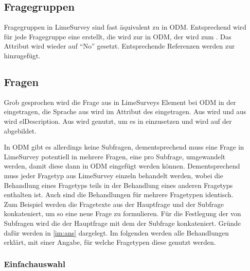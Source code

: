 \subsection{Fragegruppen}
\label{m:qg}
Fragegruppen in LimeSurvey sind fast äquivalent zu  in ODM.
Entsprechend wird für jede Fragegruppe eine  erstellt, die  wird zur  in ODM, der  wird zum .
Das Attribut  wird wieder auf \enquote{No} gesetzt. %
Entsprechende Referenzen werden zur  hinzugefügt.

\subsection{Fragen}


Grob gesprochen wird die Frage aus  in LimeSurveys  Element bei ODM in  der  eingetragen, die Sprache aus  wird im Attribut  des  eingetragen.
Aus  wird  und aus  wird el{Description}.
Aus  wird  genutzt, um es in  einzusetzen und  wird auf  der  abgebildet.

In ODM gibt es allerdings keine Subfragen, dementsprechend muss eine Frage in LimeSurvey potentiell in mehrere Fragen, eine pro Subfrage, umgewandelt werden, damit diese dann in ODM eingefügt werden können.
Dementsprechend muss jeder Fragetyp aus LimeSurvey einzeln behandelt werden, wobei die Behandlung eines Fragetyps teils in der Behandlung eines anderen Fragetyps enthalten ist.
Auch sind die Behandlungen für mehrere Fragetypen identisch.
Zum Beispiel werden die Fragetexte aus  der Hauptfrage und  der Subfrage konkateniert, um so eine neue Frage  zu formulieren.
Für die Festlegung der  von Subfragen wird die  der Hauptfrage mit dem  der Subfrage konkateniert.
Gründe dafür werden in \cref{im:ans} dargelegt.
Im folgenden werden alle Behandlungen erklärt, mit einer Angabe, für welche Fragetypen diese genutzt werden.

\subsubsection{Einfachauswahl}
\label{e:sc}

